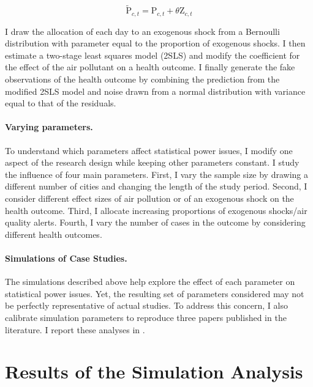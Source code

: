 \documentclass[12pt]{article}
\begin{document}
        \begin{equation}
        \widetilde{\text{P}}_{c,t} = \text{P}_{c,t} + \theta\text{Z}_{c,t}
        \end{equation}
        
        \noindent I draw the allocation of each day to an exogenous shock from a Bernoulli distribution with parameter equal to the proportion of exogenous shocks. I then estimate a two-stage least squares model (2SLS) and modify the coefficient for the effect of the air pollutant on a health outcome. I finally generate the fake observations of the health outcome by combining the prediction from the modified 2SLS model and noise drawn from a normal distribution with variance equal to that of the residuals.
        
        \paragraph{Varying parameters.} To understand which parameters affect statistical power issues, I modify one aspect of the research design while keeping other parameters constant. I study the influence of four main parameters. First, I vary the sample size by drawing a different number of cities and changing the length of the study period. Second, I consider different effect sizes of air pollution or of an exogenous shock on the health outcome. Third, I allocate increasing proportions of exogenous shocks/air quality alerts. Fourth, I vary the number of cases in the outcome by considering different health outcomes.

        \paragraph{Simulations of Case Studies.} The simulations described above help explore the effect of each parameter on statistical power issues. Yet, the resulting set of parameters considered may not be perfectly representative of actual studies. To address this concern, I also calibrate simulation parameters to reproduce three papers published in the literature. I report these analyses in .




\section{Results of the Simulation Analysis}\label{section_results}
\end{document}
